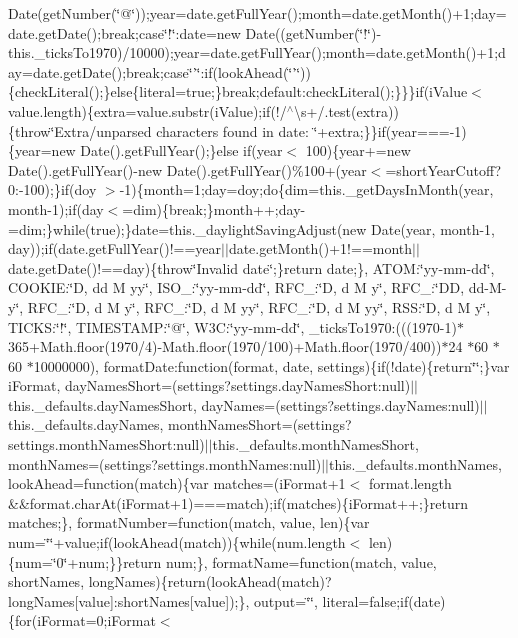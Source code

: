 {{\begin{DoxyParamCaption}
Date(get\+Number(\char`\"{}@\char`\"{}));year=date.\+get\+Full\+Year();month=date.\+get\+Month()+1;day=date.\+get\+Date();break;case\char`\"{}!\char`\"{}\+:date=new Date((get\+Number(\char`\"{}!\char`\"{})-\/this.\+\_\+ticks\+To1970)/10000);year=date.\+get\+Full\+Year();month=date.\+get\+Month()+1;day=date.\+get\+Date();break;case\char`\"{}'\char`\"{}\+:if(look\+Ahead(\char`\"{}'\char`\"{}))\{check\+Literal();\}else\{literal=true;\}break;default\+:check\+Literal();\}\}\}if(i\+Value$<$ value.\+length)\{extra=value.\+substr(i\+Value);if(!/$^\wedge$\textbackslash{}s+/.\+test(extra))\{throw\char`\"{}\+Extra/unparsed characters found in date\+: \char`\"{}+extra;\}\}if(year===-\/1)\{year=new Date().\+get\+Full\+Year();\}else if(year$<$ 100)\{year+=new Date().\+get\+Full\+Year()-\/new Date().\+get\+Full\+Year()\%100+(year$<$=short\+Year\+Cutoff?0\+:-\/100);\}if(doy $>$-\/1)\{month=1;day=doy;do\{dim=this.\+\_\+get\+Days\+In\+Month(year, month-\/1);if(day$<$=dim)\{break;\}month++;day-\/=dim;\}while(true);\}date=this.\+\_\+daylight\+Saving\+Adjust(new Date(year, month-\/1, day));if(date.\+get\+Full\+Year()!==year$\vert$$\vert$date.\+get\+Month()+1!==month$\vert$$\vert$date.\+get\+Date()!==day)\{throw\char`\"{}\+Invalid date\char`\"{};\}return date;\}, A\+T\+O\+M\+:\char`\"{}yy-\/mm-\/dd\char`\"{}, C\+O\+O\+K\+I\+E\+:\char`\"{}\+D, dd M yy\char`\"{}, I\+S\+O\+\_\+:\char`\"{}yy-\/mm-\/dd\char`\"{}, R\+F\+C\+\_\+:\char`\"{}\+D, d M y\char`\"{}, R\+F\+C\+\_\+:\char`\"{}\+D\+D, dd-\/\+M-\/y\char`\"{}, R\+F\+C\+\_\+:\char`\"{}\+D, d M y\char`\"{}, R\+F\+C\+\_\+:\char`\"{}\+D, d M yy\char`\"{}, R\+F\+C\+\_\+:\char`\"{}\+D, d M yy\char`\"{}, R\+S\+S\+:\char`\"{}\+D, d M y\char`\"{}, T\+I\+C\+K\+S\+:\char`\"{}!\char`\"{}, T\+I\+M\+E\+S\+T\+A\+M\+P\+:\char`\"{}@\char`\"{}, W3\+C\+:\char`\"{}yy-\/mm-\/dd\char`\"{}, \+\_\+ticks\+To1970\+:(((1970-\/1)$\ast$365+\+Math.\+floor(1970/4)-\/\+Math.\+floor(1970/100)+\+Math.\+floor(1970/400))$\ast$24 $\ast$60 $\ast$60 $\ast$10000000), format\+Date\+:function(format, date, settings)\{if(!date)\{return\char`\"{}\char`\"{};\}var i\+Format, day\+Names\+Short=(settings?settings.\+day\+Names\+Short\+:null)$\vert$$\vert$this.\+\_\+defaults.\+day\+Names\+Short, day\+Names=(settings?settings.\+day\+Names\+:null)$\vert$$\vert$this.\+\_\+defaults.\+day\+Names, month\+Names\+Short=(settings?settings.\+month\+Names\+Short\+:null)$\vert$$\vert$this.\+\_\+defaults.\+month\+Names\+Short, month\+Names=(settings?settings.\+month\+Names\+:null)$\vert$$\vert$this.\+\_\+defaults.\+month\+Names, look\+Ahead=function(match)\{var matches=(i\+Format+1$<$ format.\+length \&\&format.\+char\+At(i\+Format+1)===match);if(matches)\{i\+Format++;\}return matches;\}, format\+Number=function(match, value, len)\{var num=\char`\"{}\char`\"{}+value;if(look\+Ahead(match))\{while(num.\+length$<$ len)\{num=\char`\"{}0\char`\"{}+num;\}\}return num;\}, format\+Name=function(match, value, short\+Names, long\+Names)\{return(look\+Ahead(match)?long\+Names\mbox{[}value\mbox{]}\+:short\+Names\mbox{[}value\mbox{]});\}, output=\char`\"{}\char`\"{}, literal=false;if(date)\{for(i\+Format=0;i\+Format$<$ 
\end{DoxyParamCaption}}}

